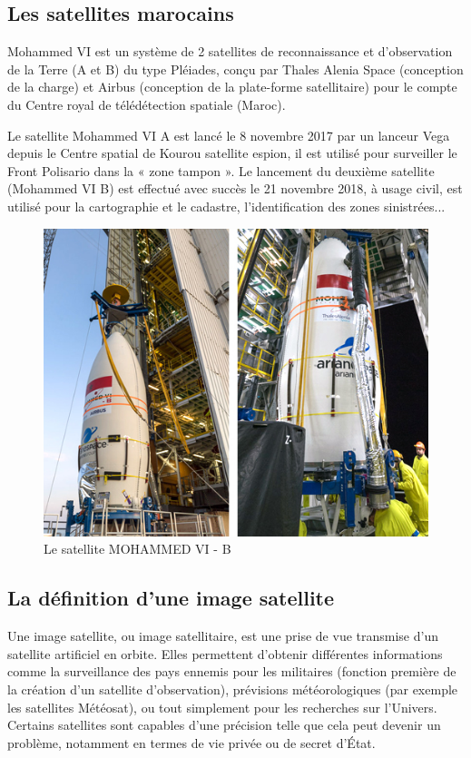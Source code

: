 \documentclass[12pt, openany]{report}
\begin{document}
\subsection{Les satellites marocains}
Mohammed VI est un système de 2 satellites de reconnaissance et d'observation de la Terre (A et B) du type Pléiades, conçu par Thales Alenia Space (conception de la charge) et Airbus (conception de la plate-forme satellitaire) pour le compte du Centre royal de télédétection spatiale (Maroc).
\par
Le satellite Mohammed VI A est lancé le 8 novembre 2017 par un lanceur Vega depuis le Centre spatial de Kourou satellite espion, il est utilisé pour surveiller le Front Polisario dans la « zone tampon ».
Le lancement du deuxième satellite (Mohammed VI B) est effectué avec succès le 21 novembre 2018, à usage civil, est utilisé pour la cartographie et le cadastre, l’identification des zones sinistrées...
\begin{figure}[H]
\centering
\includegraphics[scale=0.5]{satm6.jpg}
\caption{Le satellite MOHAMMED VI - B}
\end{figure}


\subsection{La définition d'une image satellite}
Une image satellite, ou image satellitaire, est une prise de vue transmise d'un satellite artificiel en orbite. Elles permettent d'obtenir différentes informations comme la surveillance des pays ennemis pour les militaires (fonction première de la création d'un satellite d'observation), prévisions météorologiques (par exemple les satellites Météosat), ou tout simplement pour les recherches sur l'Univers. Certains satellites sont capables d'une précision telle que cela peut devenir un problème, notamment en termes de vie privée ou de secret d'État. 
\end{document}
